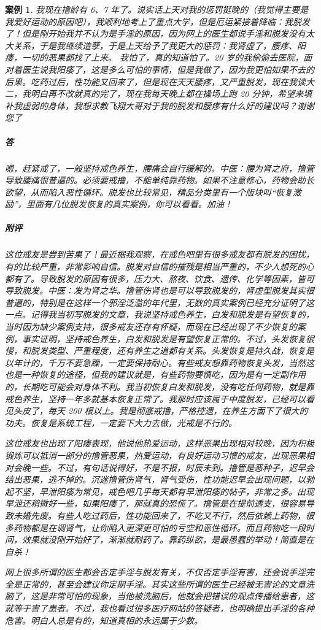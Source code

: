 \documentclass{ctexart}
\newtheorem{case}{案例}
\begin{document}
\begin{case}
    我现在撸龄有 6、7 年了。说实话上天对我的惩罚挺晚的（我觉得主要是我爱好运动的原因吧），我顺利地考上了重点大学，但是厄运紧接着降临：我脱发了！但是刚开始我并不认为是手淫的原因，因为网上的医生都说手淫和脱发没有太大关系，于是我继续造孽，于是上天给予了我更大的惩罚：我肾虚了，腰疼、阳痿，一切的恶果都找了上来。 我怕了，真的知道怕了。20 岁的我偷偷去医院，面对着医生说我阳痿了，这是多么可怕的事情，但是我做了，因为我更怕如果不去的后果。吃药过后，性功能又回来了，但是现在天天腰疼，又严重脱发，现在我读大二，我明白再不改就真的完了，现在我每天晚上都在操场上跑 20 分钟，希望来填补我虚弱的身体，我想求教飞翔大哥对于我的脱发和腰疼有什么好的建议吗？谢谢您了
    \subparagraph{答} 嗯，赶紧戒了，一般坚持戒色养生，腰痛会自行缓解的。中医：腰为肾之府，撸管导致腰痛很普遍的。必须要戒撸，不能单纯靠药物。如果不注意修心，药物会助长欲望，从而陷入恶性循环。脱发也比较常见，精品分类里有一个版块叫“恢复激励”，里面有几位脱发恢复的真实案例，你可以看看。加油！
    \subparagraph{附评} 这位戒友是尝到苦果了！最近据我观察，在戒色吧里有很多戒友都有脱发的困扰，有的比较严重，非常影响自信。脱发对自信的摧残是相当严重的，不少人想死的心都有了。导致脱发的原因有很多，压力大、熬夜、饮食、遗传、化学等因素，皆可导致脱发。中医：发为肾之华。撸管伤肾也是可以导致脱发的，肾虚型脱发其实很普遍的，特别是在这样一个邪淫泛滥的年代里，无数的真实案例已经充分证明了这一点。记得我当初写脱发的文章，我说坚持戒色养生，白发和脱发是有望恢复的，当时因为缺少案例支持，很多戒友还存有怀疑，而现在已经出现了不少恢复的案例，事实证明，坚持戒色养生，白发和脱发是有望恢复正常的。不过，头发恢复很慢，和脱发类型、严重程度，还有养生之道都有关系。头发恢复是持久战，恢复是以年计的，千万不要急躁，一定要保持耐心。有些戒友想靠药物恢复头发，当然这也是一种恢复的途径，但我的建议就是，有些药物要慎吃，因为是有一定副作用的，长期吃可能会对身体不利。我当初恢复白发和脱发，没有吃任何药物，就是靠戒色养生，坚持一年多就基本恢复正常了。我那时应该属于中度脱发，已经可以看见头皮了，每天 200 根以上。我是彻底戒撸，严格控遗，在养生方面下了很大的功夫。恢复是系统工程，一定要下大力去做，光戒是不行的。

    这位戒友也出现了阳痿表现，他说他热爱运动，这样恶果出现相对较晚，因为积极锻炼可以抵消一部分的撸管恶果，热爱运动，有良好运动习惯的戒友，出现恶果相对会晚一些。不过，有句话说得好，不是不报，时辰未到。撸管是恶种子，迟早会结出恶果，逃不掉的。沉迷撸管伤肾气，肾气受伤，性功能迟早会出现问题，以勃起不坚，早泄阳痿为常见，戒色吧几乎每天都有早泄阳痿的帖子，非常之多。出现早泄还稍微好一些，如果阳痿了，那就真的恐慌了。撸管是在提前透支，很容易导致未婚先废。有些人吃过药后，性功能回来了，不吃又不行，然后依赖上药物，很多药物都是在调肾气，让你陷入更深更可怕的亏空和恶性循环。而且药物吃一段时间，效果就没刚开始好了，渐渐就耐药了。靠药纵欲，是最愚蠢的举动！简直是在自杀！

    网上很多所谓的医生都会否定手淫与脱发有关，不仅否定手淫有害，还会说手淫完全是正常的，甚至会建议你定期手淫。其实这些所谓的医生已经被无害论的文章洗脑了，这是非常可怕的现象，当他被洗脑后，他就会把错误的观点传播给患者，这就等于害了患者。不过，我也看过很多医疗网站的答疑者，也明确提出手淫的各种危害。明白人总是有的，知道真相的永远属于少数。
\end{case}
\end{document}

